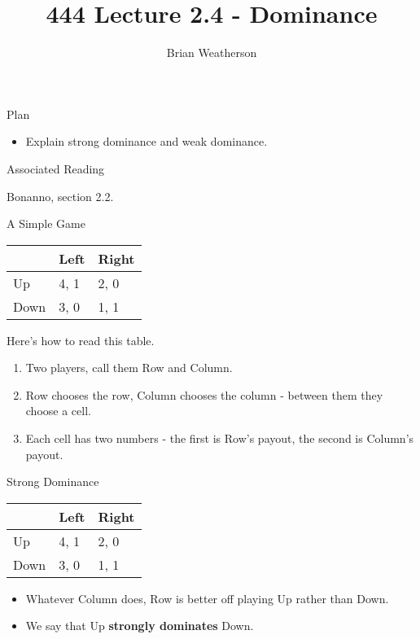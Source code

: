 \documentclass[
  ignorenonframetext,
]{beamer}
\title{444 Lecture 2.4 - Dominance}
\author{Brian Weatherson}
\date{}
\providecommand{\tightlist}{%
  \setlength{\itemsep}{0pt}\setlength{\parskip}{0pt}}
\begin{document}
\frame{\titlepage}

\begin{frame}{Plan}
\protect\hypertarget{plan}{}

\begin{itemize}
\tightlist
\item
  Explain strong dominance and weak dominance.
\end{itemize}

\end{frame}

\begin{frame}{Associated Reading}
\protect\hypertarget{associated-reading}{}

Bonanno, section 2.2.

\end{frame}

\begin{frame}{A Simple Game}
\protect\hypertarget{a-simple-game}{}

\begin{table}[!h]
\centering
\begin{tabular}[t]{>{}l|ll}
\toprule
 & Left & Right\\
\midrule
Up & 4, 1 & 2, 0\\
Down & 3, 0 & 1, 1\\
\bottomrule
\end{tabular}
\end{table}

Here's how to read this table.

\begin{enumerate}[<+->]
\tightlist
\item
  Two players, call them Row and Column.
\item
  Row chooses the row, Column chooses the column - between them they
  choose a cell.
\item
  Each cell has two numbers - the first is Row's payout, the second is
  Column's payout.
\end{enumerate}

\end{frame}

\begin{frame}{Strong Dominance}
\protect\hypertarget{strong-dominance}{}

\begin{table}[!h]
\centering
\begin{tabular}[t]{>{}l|ll}
\toprule
 & Left & Right\\
\midrule
Up & 4, 1 & 2, 0\\
Down & 3, 0 & 1, 1\\
\bottomrule
\end{tabular}
\end{table}

\begin{itemize}
\tightlist
\item
  Whatever Column does, Row is better off playing Up rather than Down.
\item
  We say that Up \textbf{strongly dominates} Down.
\end{itemize}

\end{frame}
\end{document}
